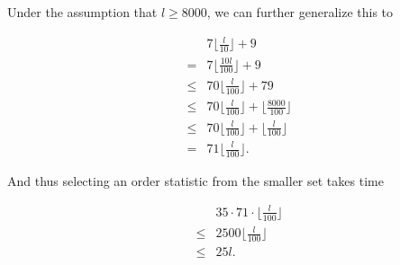 Under the assumption that $l \geq 8000$, we can further generalize this to

\begin{align*}
    && 7 \lfloor \frac l {10} \rfloor + 9 \\
    &=& 7 \lfloor \frac {10l} {100} \rfloor + 9 \\
    &\leq& 70 \lfloor \frac {l} {100} \rfloor + 79 \\
    &\leq& 70 \lfloor \frac {l} {100} \rfloor + \lfloor \frac {8000} {100} \rfloor \\
    &\leq& 70 \lfloor \frac {l} {100} \rfloor + \lfloor \frac {l} {100} \rfloor \\
    &=& 71 \lfloor \frac {l} {100} \rfloor.
\end{align*}

And thus selecting an order statistic from the smaller set takes time

\begin{align*}
    && 35 \cdot 71 \cdot \lfloor \frac {l} {100} \rfloor \\
    &\leq& 2500 \lfloor \frac {l} {100} \rfloor \\
    &\leq& 25 l.
\end{align*}